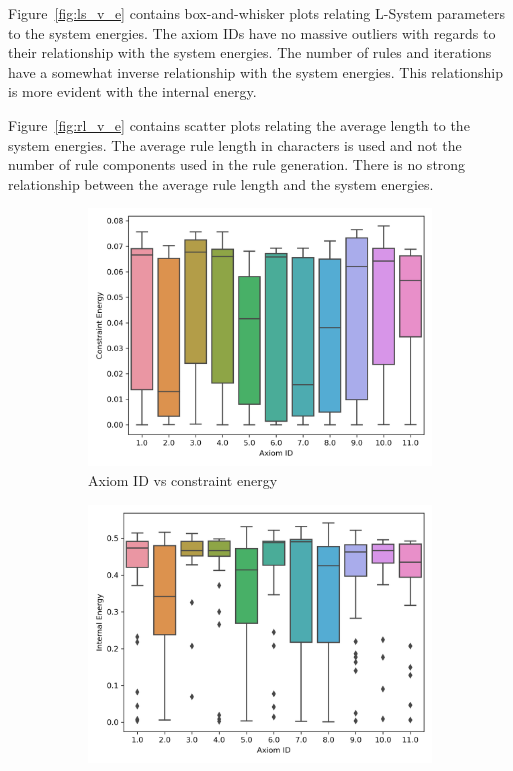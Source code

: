 Figure~\ref{fig:ls_v_e} contains box-and-whisker plots relating L-System parameters to the system energies. The axiom IDs have no massive outliers with regards to their relationship with the system energies. The number of rules and iterations have a somewhat inverse relationship with the system energies. This relationship is more evident with the internal energy.

Figure~\ref{fig:rl_v_e} contains scatter plots relating the average length to the system energies. The average rule length in characters is used and not the number of rule components used in the rule generation. There is no strong relationship between the average rule length and the system energies.

\begin{figure}[H]
	\centering
	\begin{subfigure}[t]{0.45\textwidth}
		\centering
		\includegraphics[width=\textwidth]{aid_vs_ce.png}
		\caption{Axiom ID vs constraint energy}
	\end{subfigure}
	\hfill
	\begin{subfigure}[t]{0.45\textwidth}
		\centering
		\includegraphics[width=\textwidth]{aid_vs_ie.png}

\end{subfigure}
\end{figure}
